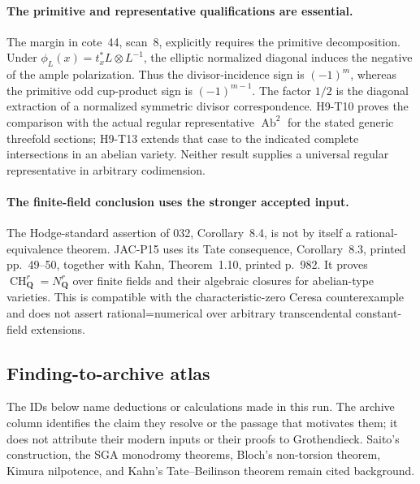 \documentclass[11pt,a4paper]{article}
\begin{document}
\paragraph{The primitive and representative qualifications are essential.}
The margin in cote~44, scan~8, explicitly requires the primitive
decomposition. Under $\phi_L(x)=t_x^*L\otimes L^{-1}$, the
elliptic normalized diagonal induces the negative of the ample
polarization. Thus the divisor-incidence sign is $(-1)^m$,
whereas the primitive odd cup-product sign is $(-1)^{m-1}$.
The factor $1/2$ is the diagonal extraction of a normalized
symmetric divisor correspondence. H9-T10 proves the comparison
with the actual regular representative $\operatorname{Ab}^2$
for the stated generic threefold sections; H9-T13 extends that
case to the indicated complete intersections in an abelian variety.
Neither result supplies a universal regular representative in
arbitrary codimension.

\paragraph{The finite-field conclusion uses the stronger accepted input.}
The Hodge-standard assertion of 032, Corollary~8.4, is not by
itself a rational-equivalence theorem. JAC-P15 uses its Tate
consequence, Corollary~8.3, printed pp.~49--50, together with
Kahn, Theorem~1.10, printed p.~982. It proves
$\operatorname{CH}^r_{\mathbf Q}=N^r_{\mathbf Q}$ over finite
fields and their algebraic closures for abelian-type varieties.
This is compatible with the characteristic-zero Ceresa
counterexample and does not assert rational=numerical over
arbitrary transcendental constant-field extensions.

\subsection*{Finding-to-archive atlas}

The IDs below name deductions or calculations made in this run.
The archive column identifies the claim they resolve or the
passage that motivates them; it does not attribute their modern
inputs or their proofs to Grothendieck. Saito's construction,
the SGA monodromy theorems, Bloch's non-torsion theorem, Kimura
nilpotence, and Kahn's Tate--Beilinson theorem remain cited
background.
\end{document}
